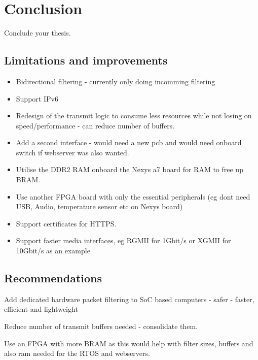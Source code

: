 \chapter[Conclusion]{Conclusion}
\label{Chap:Conclusion}

Conclude your thesis.


\section{Limitations and improvements}

\begin{itemize}
    \item Bidirectional filtering - currently only doing incomming filtering
    \item Support IPv6
    \item Redesign of the transmit logic to consume less resources while not losing on speed/performance - can reduce number of buffers. 
    \item Add a second interface - would need a new pcb and would need onboard switch if webserver was also wanted.
    \item Utilise the DDR2 RAM onboard the Nexys a7 board for RAM to free up BRAM. 
    \item Use another FPGA board with only the essential peripherals (eg dont need USB, Audio, temperature sensor etc on Nexys board)
    \item Support certificates for HTTPS. 
    \item Support faster media interfaces, eg RGMII for 1Gbit/s or XGMII for 10Gbit/s as an example
\end{itemize}


\section{Recommendations}

Add dedicated hardware packet filtering to SoC based computers - safer - faster, efficient and lightweight

Reduce number of transmit buffers needed - consolidate them.

Use an FPGA with more BRAM as this would help with filter sizes, buffers and also ram needed for the RTOS and webservers.

